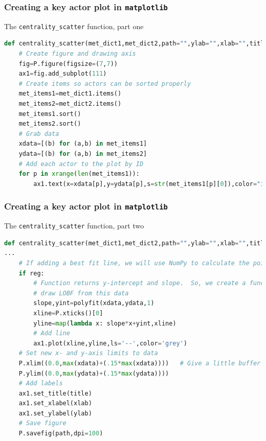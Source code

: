 \documentclass[xcolor=dvipsnames, 9pt]{beamer}
\begin{document}
\begin{frame}[fragile]
    \frametitle{Creating a key actor plot in \texttt{matplotlib}}
        \begin{block}{The \texttt{centrality\_scatter} function, part one}
            \scriptsize{\begin{lstlisting}[language=Python]
def centrality_scatter(met_dict1,met_dict2,path="",ylab="",xlab="",title="",reg=False):
    # Create figure and drawing axis
    fig=P.figure(figsize=(7,7))
    ax1=fig.add_subplot(111)
    # Create items so actors can be sorted properly
    met_items1=met_dict1.items()
    met_items2=met_dict2.items()
    met_items1.sort()
    met_items2.sort()
    # Grab data
    xdata=[(b) for (a,b) in met_items1]
    ydata=[(b) for (a,b) in met_items2]
    # Add each actor to the plot by ID
    for p in xrange(len(met_items1)):
        ax1.text(x=xdata[p],y=ydata[p],s=str(met_items1[p][0]),color="indigo")
            \end{lstlisting}}
        \end{block}
    \begin{itemize}
    \end{itemize}
\end{frame}

\begin{frame}[fragile]
    \frametitle{Creating a key actor plot in \texttt{matplotlib}}
    \begin{block}{The \texttt{centrality\_scatter} function, part two}
        \scriptsize{\begin{lstlisting}[language=Python]
def centrality_scatter(met_dict1,met_dict2,path="",ylab="",xlab="",title="",reg=False):
...
    # If adding a best fit line, we will use NumPy to calculate the points.
    if reg:
        # Function returns y-intercept and slope.  So, we create a function to 
        # draw LOBF from this data
        slope,yint=polyfit(xdata,ydata,1)
        xline=P.xticks()[0]
        yline=map(lambda x: slope*x+yint,xline)
        # Add line
        ax1.plot(xline,yline,ls='--',color='grey')
    # Set new x- and y-axis limits to data
    P.xlim((0.0,max(xdata)+(.15*max(xdata))))   # Give a little buffer
    P.ylim((0.0,max(ydata)+(.15*max(ydata))))
    # Add labels
    ax1.set_title(title)
    ax1.set_xlabel(xlab)
    ax1.set_ylabel(ylab)
    # Save figure
    P.savefig(path,dpi=100)
        \end{lstlisting}}
    \end{block}
    \scriptsize{\begin{itemize}
    \end{itemize}}
\end{frame}
\end{document}
